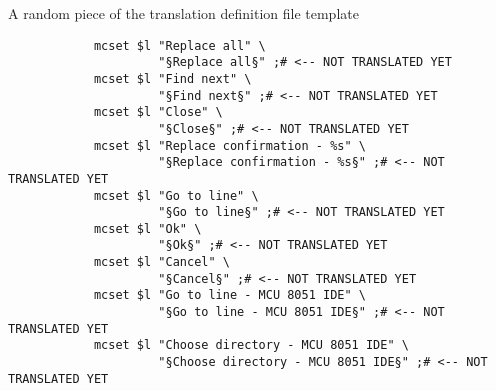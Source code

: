 \documentclass[a4paper,twoside,12pt]{book}
\newcommand{\mysmallfont}{\fontsize{8pt}{10pt} \selectfont{}}
\begin{document}
	\bigskip
	\noindent
	{
		A random piece of the translation definition file template\\
		\mysmallfont{}
		\begin{verbatim}
			mcset $l "Replace all" \
			         "§Replace all§" ;# <-- NOT TRANSLATED YET
			mcset $l "Find next" \
			         "§Find next§" ;# <-- NOT TRANSLATED YET
			mcset $l "Close" \
			         "§Close§" ;# <-- NOT TRANSLATED YET
			mcset $l "Replace confirmation - %s" \
			         "§Replace confirmation - %s§" ;# <-- NOT TRANSLATED YET
			mcset $l "Go to line" \
			         "§Go to line§" ;# <-- NOT TRANSLATED YET
			mcset $l "Ok" \
			         "§Ok§" ;# <-- NOT TRANSLATED YET
			mcset $l "Cancel" \
			         "§Cancel§" ;# <-- NOT TRANSLATED YET
			mcset $l "Go to line - MCU 8051 IDE" \
			         "§Go to line - MCU 8051 IDE§" ;# <-- NOT TRANSLATED YET
			mcset $l "Choose directory - MCU 8051 IDE" \
			         "§Choose directory - MCU 8051 IDE§" ;# <-- NOT TRANSLATED YET
		\end{verbatim}
	}

\appendix
\twocolumn
\end{document}
